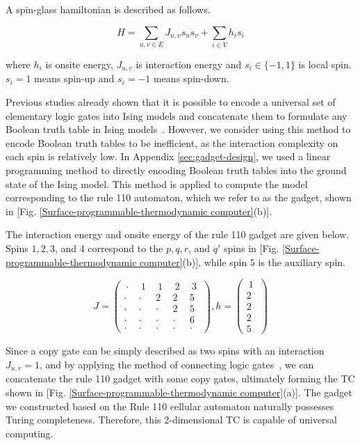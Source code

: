 \documentclass[twocolumn,superscriptaddress,english,showpacs,longbibliography]{revtex4-2}
\begin{document}
A spin-glass hamiltonian is described as follows.

\begin{equation}
H = \sum_{u,v \in E} J_{u,v}s_us_v + \sum_{i\in V}h_i s_i
\end{equation}

where $h_i$ is onsite energy, $J_{u,v}$ is interaction energy and
$s_i \in \{-1, 1\}$ is local spin. $s_i=1$ means spin-up and $s_i=-1$ means spin-down.

Previous studies already shown that it is possible to encode a universal set of elementary logic gates into Ising models and concatenate them to formulate any Boolean truth table in Ising models~\cite{onizawa2020design, camsari2017stochastic, Aadit2022}. However, we consider using this method to encode Boolean truth tables to be inefficient, as the interaction complexity on each spin is relatively low. In Appendix \ref{sec:gadget-design}, we used a linear programming method to directly encoding Boolean truth tables into the ground state of the Ising model. This method is applied to compute the model corresponding to the rule 110 automaton, which we refer to as the gadget, shown in [Fig. \ref{Surface-programmable-thermodynamic computer}(b)].

The interaction energy and onsite energy of the rule 110 gadget are given below. Spins $1, 2, 3$, and $4$ correspond to the $p, q, r$, and $q'$ spins in [Fig. \ref{Surface-programmable-thermodynamic computer}(b)], while spin $5$ is the auxiliary spin.

\begin{equation}
J = \begin{pmatrix}
~\cdot~ & ~1~ & ~1~ & ~2~ & ~3~\\
\cdot & \cdot & 2 & 2 & 5\\
\cdot & \cdot & \cdot & 2 & 5\\
\cdot & \cdot & \cdot & \cdot & 6\\
\cdot & \cdot & \cdot & \cdot & \cdot
\end{pmatrix}, h = \begin{pmatrix}
~1~\\
2\\
2\\
2\\
5
\end{pmatrix}
\end{equation}

Since a copy gate can be simply described as two spins with an interaction $J_{u, v}=1$, and by applying the method of connecting logic gates~\cite{Aadit2022}, we can concatenate the rule 110 gadget with some copy gates, ultimately forming the TC shown in [Fig. \ref{Surface-programmable-thermodynamic computer}(a)]. The gadget we constructed based on the Rule 110 cellular automaton
naturally possesses Turing completeness. Therefore, this 2-dimensional TC is capable of universal computing.
\end{document}
